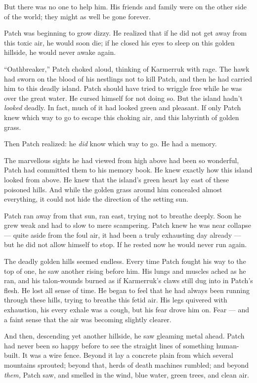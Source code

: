 \documentclass[ebook,oneside,openany,17pt]{memoir}
\newenvironment{tolerant}[1]{%
  \par\tolerance=#1\relax
}{%
  \par
}
\begin{document}
But there was no one to help him. His friends and family were on the
other side of the world; they might as well be gone forever.

Patch was beginning to grow dizzy. He realized that if he did not get
away from this toxic air, he would soon die; if he closed his eyes to
sleep on this golden hillside, he would never awake again.

\begin{tolerant}{500}
“Oathbreaker,” Patch choked aloud, thinking of Karmerruk with
rage. The hawk had sworn on the blood of his nestlings not to kill
Patch, and then he had carried him to this deadly island. Patch should
have tried to wriggle free while he was over the great water. He
cursed himself for not doing so. But the island hadn’t \emph{looked}
deadly. In fact, much of it had looked green and pleasant. If only
Patch knew which way to go to escape this choking air, and this
labyrinth of golden grass.
\end{tolerant}

Then Patch realized: he \emph{did} know which way to go. He had a
memory.

The marvellous sights he had viewed from high above had been so
wonderful, Patch had committed them to his memory book. He knew
exactly how this island looked from above. He knew that the island’s
green heart lay east of these poisoned hills. And while the golden
grass around him concealed almost everything, it could not hide the
direction of the setting sun.

Patch ran away from that sun, ran east, trying not to breathe
deeply. Soon he grew weak and had to slow to mere scampering. Patch
knew he was near collapse — quite aside from the foul air, it had been
a truly exhausting day already — but he did not allow himself to
stop. If he rested now he would never run again.

The deadly golden hills seemed endless. Every time Patch fought his
way to the top of one, he saw another rising before him. His lungs and
muscles ached as he ran, and his talon-wounds burned as if Karmerruk’s
claws still dug into in Patch’s flesh. He lost all sense of time. He
began to feel that he had always been running through these hills,
trying to breathe this fetid air. His legs quivered with exhaustion,
his every exhale was a cough, but his fear drove him on. Fear — and a
faint sense that the air was becoming slightly clearer.

\begin{tolerant}{500}
And then, descending yet another hillside, he saw gleaming metal
ahead. Patch had never been so happy before to see the straight lines
of something human-built. It was a wire fence. Beyond it lay a
concrete plain from which several mountains sprouted; beyond that,
herds of death machines rumbled; and beyond \emph{them,} Patch saw,
and smelled in the wind, blue water, green trees, and clean air.
\end{tolerant}
\end{document}
